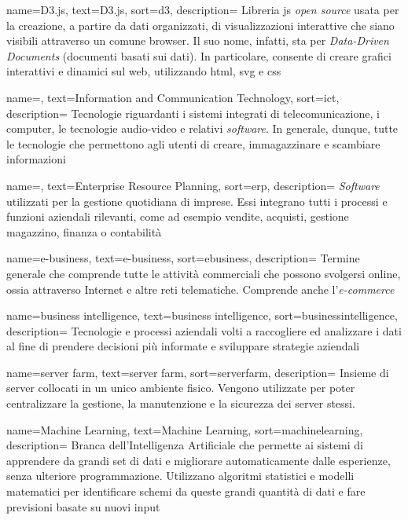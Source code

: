  {
    name=D3.js,
    text=D3.js,
    sort=d3,
    description=
    {Libreria \gls{js} \emph{open source} usata per la creazione, a partire da dati organizzati, di visualizzazioni interattive che siano visibili attraverso un comune browser.
    Il suo nome, infatti, sta per \emph{Data-Driven Documents} (documenti basati sui dati). 
    In particolare, consente di creare grafici interattivi e dinamici sul web, utilizzando \gls{html}, \gls{svg} e \gls{css}}
}

 {
    name=,
    text=Information and Communication Technology,
    sort=ict,
    description=
    {Tecnologie riguardanti i sistemi integrati di telecomunicazione, i computer, le tecnologie audio-video e relativi \emph{software}.
    In generale, dunque, tutte le tecnologie che permettono agli utenti di creare, immagazzinare e scambiare informazioni}
}

 {
    name=,
    text=Enterprise Resource Planning,
    sort=erp,
    description=
    {\emph{Software} utilizzati per la gestione quotidiana di imprese.
    Essi integrano tutti i processi e funzioni aziendali rilevanti, come ad esempio vendite, acquisti, gestione magazzino, finanza o contabilità}
}

 {
    name=e-business,
    text=e-business,
    sort=ebusiness,
    description=
    {Termine generale che comprende tutte le attività commerciali che possono svolgersi online, ossia attraverso 
    Internet e altre reti telematiche. Comprende anche l'\emph{e-commerce}}
}

 {
    name=business intelligence,
    text=business intelligence,
    sort=businessintelligence,
    description=
    {Tecnologie e processi aziendali volti a raccogliere ed analizzare i dati al fine di prendere decisioni più informate e 
    sviluppare strategie aziendali}
}

 {
    name=server farm,
    text=server farm,
    sort=serverfarm,
    description=
    {Insieme di server collocati in un unico ambiente fisico.
    Vengono utilizzate per poter centralizzare la gestione, la manutenzione e la sicurezza dei server stessi.}
}

 {
    name=Machine Learning,
    text=Machine Learning,
    sort=machinelearning,
    description=
    {Branca dell'Intelligenza Artificiale che permette ai sistemi
    di apprendere da grandi set di dati e migliorare automaticamente dalle esperienze, senza ulteriore programmazione. 
    Utilizzano algoritmi statistici e modelli matematici per identificare schemi da queste grandi quantità di dati e fare
    previsioni basate su nuovi input}
}

